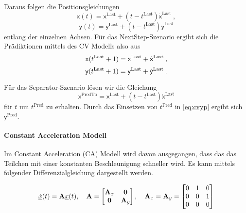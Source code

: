 Daraus folgen die Positionsgleichungen 
\begin{equation*}
    \mathsf{x}(t) = \mathsf{x}^{\text{Last}} + (t - t^{\text{Last}})\dot{\mathsf{x}}^{\text{Last}} \: ,
\end{equation*}
\begin{equation*}
    \mathsf{y}(t) = \mathsf{y}^{\text{Last}} + (t - t^{\text{Last}})\dot{\mathsf{y}}^{\text{Last}}
\end{equation*}
% 
entlang der einzelnen Achsen.
Für das NextStep-Szenario ergibt sich die Prädiktionen mittels des CV Modells also aus
\begin{equation*}
    \mathsf{x}(t{^{\text{Last}}}+1) = \mathsf{x}^{\text{Last}} + \dot{\mathsf{x}}^{\text{Last}} \: ,
\end{equation*}
\begin{equation}\label{eq:cvyp}
    \mathsf{y}(t{^{\text{Last}}}+1) = \mathsf{y}^{\text{Last}} + \dot{\mathsf{y}}^{\text{Last}} \: .
\end{equation}

Für das Separator-Szenario lösen wir die Gleichung 
% 
\begin{equation*}
    \mathsf{x}^{\text{PredTo}} = \mathsf{x}^{\text{Last}} + (t - t^{\text{Last}})\dot{\mathsf{x}}^{\text{Last}}
\end{equation*}
% 
für \(t\) um  \(t^{\text{Pred}}\) zu erhalten.
Durch das Einsetzen von \(t^{\text{Pred}}\) in \eqref{eq:cvyp} ergibt sich \(\mathsf{y}^{\text{Pred}}\).

\paragraph{Constant Acceleration Modell}

Im Constant Acceleration (CA) Modell wird davon ausgegangen, dass das das Teilchen mit einer konstanten Beschleunigung schneller wird.
Es kann mittels folgender Differenzialgleichung dargestellt werden.

\begin{align*} \label{eq:speedCV}
    \dot{{\underline{x}}}(t) = {{\mathbf{A}}}{\underline{x}}(t), \quad {\ensuremath{{\mathbf{A}}}} = 
    \begin{bmatrix}
        {\ensuremath{{\mathbf{A}}}}_x & \boldsymbol{0} \\
        \boldsymbol{0} & {{\mathbf{A}}}_y
    \end{bmatrix} 
    , \quad
    {\ensuremath{{\mathbf{A}}}}_x = {{\mathbf{A}}}_y = 
    \begin{bmatrix}
        0 & 1 & 0 \\
        0 & 0 & 1 \\
        0 & 0 & 0
    \end{bmatrix} 
\end{align*}

